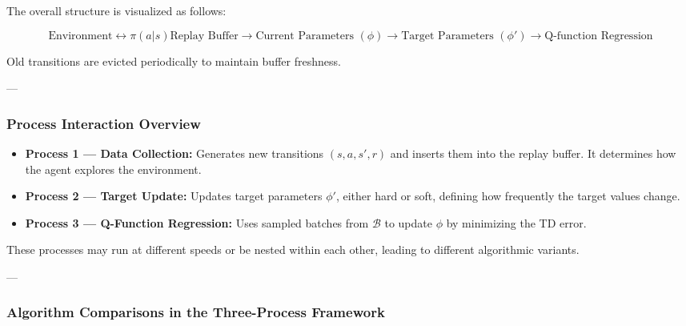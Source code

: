 \documentclass[12pt]{article}
\theoremstyle{definition} %
\theoremstyle{plain} %
\theoremstyle{remark} %
\begin{document}
\begin{CJK}{UTF8}{gbsn}
The overall structure is visualized as follows:

\[
\text{Environment} 
\leftrightarrow{\pi(a|s)}
\text{Replay Buffer} 
\longrightarrow 
\text{Current Parameters } (\phi)
\longrightarrow 
\text{Target Parameters } (\phi')
\longrightarrow 
\text{Q-function Regression}
\]

Old transitions are evicted periodically to maintain buffer freshness.

---

\subsubsection{Process Interaction Overview}

\begin{itemize}
    \item \textbf{Process 1 — Data Collection:}  
    Generates new transitions $(s, a, s', r)$ and inserts them into the replay buffer.  
    It determines how the agent explores the environment.

    \item \textbf{Process 2 — Target Update:}  
    Updates target parameters $\phi'$, either hard or soft, defining how frequently the target values change.

    \item \textbf{Process 3 — Q-Function Regression:}  
    Uses sampled batches from $\mathcal{B}$ to update $\phi$ by minimizing the TD error.
\end{itemize}

These processes may run at different speeds or be nested within each other, leading to different algorithmic variants.

---

\subsubsection{Algorithm Comparisons in the Three-Process Framework}

\begin{table}[h!]
\centering
{}
\end{table}


\end{CJK}
\end{document}
